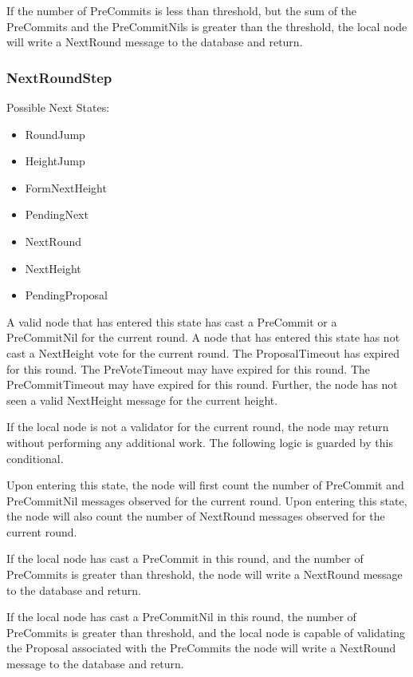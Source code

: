 If the number of PreCommits is less than threshold, but the sum of the
PreCommits and the PreCommitNils is greater than the threshold, the
local node will write a NextRound message to the database and return.


\subsubsection{NextRoundStep}

Possible Next States:

\begin{itemize}
    \item RoundJump
    \item HeightJump
    \item FormNextHeight
    \item PendingNext
    \item NextRound
    \item NextHeight
    \item PendingProposal
\end{itemize}

A valid node that has entered this state has cast a PreCommit or a
PreCommitNil for the current round.
A node that has entered this state has not cast a NextHeight vote for
the current round.
The ProposalTimeout has expired for this round.
The PreVoteTimeout may have expired for this round.
The PreCommitTimeout may have expired for this round.
Further, the node has not seen a valid NextHeight message for the
current height.

If the local node is not a validator for the current round, the node
may return without performing any additional work.
The following logic is guarded by this conditional.

Upon entering this state, the node will first count the number of
PreCommit and PreCommitNil messages observed for the current round.
Upon entering this state, the node will also count the number of
NextRound messages observed for the current round.

If the local node has cast a PreCommit in this round, and the number of
PreCommits is greater than threshold, the node will write a NextRound
message to the database and return.

If the local node has cast a PreCommitNil in this round, the number of
PreCommits is greater than threshold, and the local node is capable of
validating the Proposal associated with the PreCommits the node will
write a NextRound message to the database and return.

